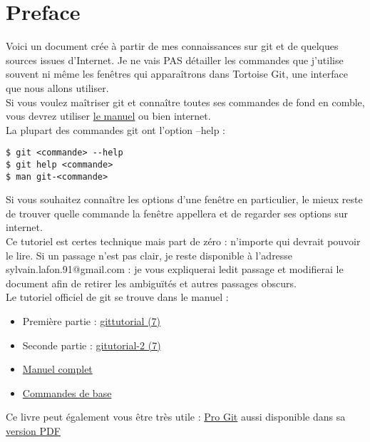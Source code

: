 \section*{Preface}
Voici un document crée à partir de mes connaissances sur git et de quelques sources issues d'Internet. Je ne vais PAS détailler les commandes que j'utilise souvent ni même les fenêtres qui apparaîtrons dans Tortoise Git, une interface que nous allons utiliser.\\

Si vous voulez maîtriser git et connaître toutes ses commandes de fond en comble, vous devrez utiliser \href{https://www.kernel.org/pub/software/scm/git/docs/}{le manuel} ou bien internet.\\

La plupart des commandes git ont l'option --help :
\begin{verbatim}
$ git <commande> --help 
$ git help <commande>
$ man git-<commande>
\end{verbatim}

Si vous souhaitez connaître les options d'une fenêtre en particulier, le mieux reste de trouver quelle commande la fenêtre appellera et de regarder ses options sur internet.\\

Ce tutoriel est certes technique mais part de zéro : n'importe qui devrait pouvoir le lire. Si un passage n'est pas clair, je reste disponible à l'adresse sylvain.lafon.91@gmail.com : je vous expliquerai ledit passage et modifierai le document afin de retirer les ambiguïtés et autres passages obscurs.\\

Le tutoriel officiel de git se trouve dans le manuel :
\begin{itemize}
\item Première partie : \href{https://www.kernel.org/pub/software/scm/git/docs/gittutorial.html}{gittutorial (7)}
\item Seconde partie : \href{https://www.kernel.org/pub/software/scm/git/docs/gittutorial-2.html}{gitutorial-2 (7)}
\item \href{https://www.kernel.org/pub/software/scm/git/docs/user-manual.html}{Manuel complet}
\item \href{https://www.kernel.org/pub/software/scm/git/docs/everyday.html}{Commandes de base}\\
\end{itemize}

Ce livre peut également vous être très utile : \href{https://git-scm.com/book/fr/v2}{Pro Git} aussi disponible dans sa \href{https://progit2.s3.amazonaws.com/fr/2016-03-05-4c838/progit-fr.1062.pdf}{version PDF}
